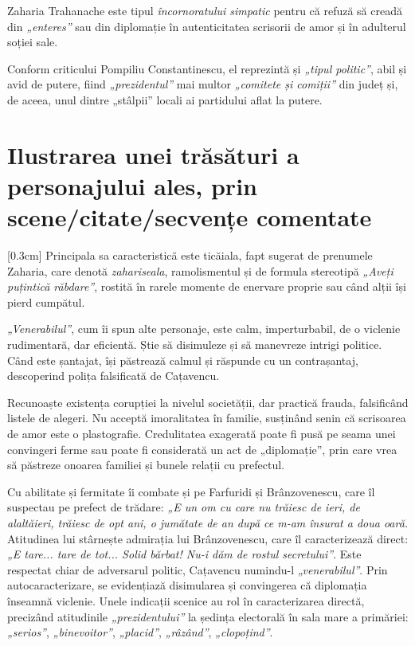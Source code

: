 Zaharia Trahanache este tipul \textit{încornoratului simpatic} pentru că refuză să creadă din \textit{„enteres”} sau din diplomație în autenticitatea scrisorii de amor și în adulterul soției sale.

Conform criticului Pompiliu Constantinescu, el reprezintă și \textit{„tipul politic”}, abil și avid de putere, fiind \textit{„prezidentul”} mai multor \textit{„comitete și comiții”} din județ și, de aceea, unul dintre „stâlpii” locali ai partidului aflat la putere.

\section{Ilustrarea unei trăsături a personajului ales, prin sce\-ne/ci\-ta\-te/sec\-ven\-țe comentate}

[0.3cm]
Principala sa caracteristică este ticăiala, fapt sugerat de prenumele Zaharia, care denotă \textit{zahariseala}, ramolismentul și de formula stereotipă \textit{„Aveți puțintică răbdare”}, rostită în rarele momente de enervare proprie sau când alții își pierd cumpătul.

\textit{„Venerabilul”}, cum îi spun alte personaje, este calm, imperturbabil, de o viclenie rudimentară, dar eficientă. Știe să disimuleze și să manevreze intrigi politice. Când este șantajat, își păstrează calmul și răspunde cu un contrașantaj, descoperind polița falsificată de Cațavencu.

Recunoaște existența corupției la nivelul societății, dar practică frauda, falsificând listele de alegeri. Nu acceptă imoralitatea în familie, susținând senin că scrisoarea de amor este o plastografie. Credulitatea exagerată poate fi pusă pe seama unei convingeri ferme sau poate fi considerată un act de „diplomație”, prin care vrea să păstreze onoarea familiei și bunele relații cu prefectul.

Cu abilitate și fermitate îi combate și pe Farfuridi și Brânzovenescu, care îl suspectau pe prefect de trădare: \textit{„E un om cu care nu trăiesc de ieri, de alaltăieri, trăiesc de opt ani, o jumătate de an după ce m-am însurat a doua oară.} Atitudinea lui stârnește admirația lui Brânzovenescu, care îl caracterizează direct: \textit{„E tare... tare de tot... Solid bărbat! Nu-i dăm de rostul secretului”}. Este respectat chiar de adversarul politic, Cațavencu numindu-l \textit{„venerabilul”}. Prin autocaracterizare, se evidențiază disimularea și convingerea că diplomația înseamnă viclenie. Unele indicații scenice au rol în caracterizarea directă, precizând atitudinile \textit{„prezidentului”} la ședința electorală în sala mare a primăriei: \textit{„serios”}, \textit{„binevoitor”}, \textit{„placid”}, \textit{„râzând”}, \textit{„clopoțind”}.

